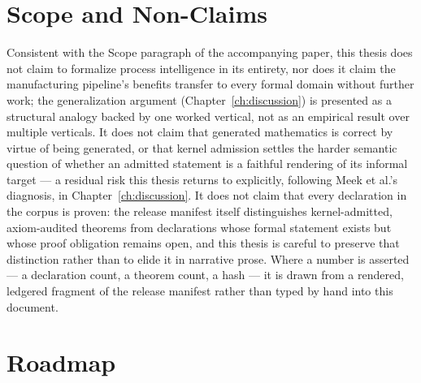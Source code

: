 \section{Scope and Non-Claims}

Consistent with the Scope paragraph of the accompanying paper, this
thesis does not claim to formalize process intelligence in its entirety,
nor does it claim the manufacturing pipeline's benefits transfer to every
formal domain without further work; the generalization argument
(Chapter~\ref{ch:discussion}) is presented as a structural analogy backed
by one worked vertical, not as an empirical result over multiple
verticals. It does not claim that generated mathematics is correct by
virtue of being generated, or that kernel admission settles the harder
semantic question of whether an admitted statement is a faithful
rendering of its informal target --- a residual risk this thesis returns
to explicitly, following Meek et al.'s diagnosis, in
Chapter~\ref{ch:discussion}. It does not claim that every declaration in
the corpus is proven: the release manifest itself distinguishes
kernel-admitted, axiom-audited theorems from declarations whose formal
statement exists but whose proof obligation remains open, and this
thesis is careful to preserve that distinction rather than to elide it in
narrative prose. Where a number is asserted --- a declaration count, a
theorem count, a hash --- it is drawn from a rendered, ledgered fragment
of the release manifest rather than typed by hand into this document.

\section{Roadmap}

